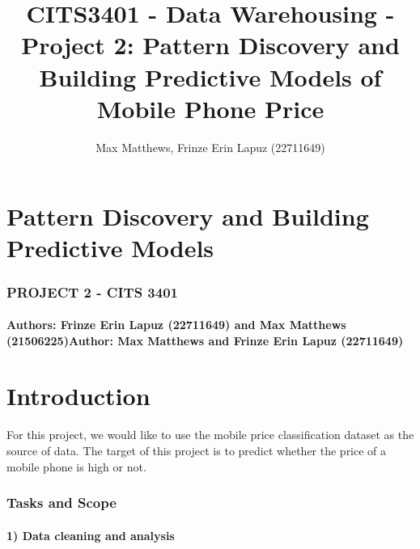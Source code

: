 \documentclass[11pt]{article}
\title{CITS3401 - Data Warehousing - Project 2: Pattern Discovery and Building Predictive Models of Mobile Phone Price}
\author{Max Matthews, Frinze Erin Lapuz (22711649)}
\begin{document}
    
    \maketitle
    
    

    
    \hypertarget{pattern-discovery-and-building-predictive-models}{%
\section{Pattern Discovery and Building Predictive
Models}\label{pattern-discovery-and-building-predictive-models}}

\hypertarget{project-2---cits-3401}{%
\subsubsection{PROJECT 2 - CITS 3401}\label{project-2---cits-3401}}

\hypertarget{authors-frinze-erin-lapuz-22711649-and-max-matthews-21506225author-max-matthews-and-frinze-erin-lapuz-22711649}{%
\paragraph{Authors: Frinze Erin Lapuz (22711649) and Max Matthews
(21506225)Author: Max Matthews and Frinze Erin Lapuz
(22711649)}\label{authors-frinze-erin-lapuz-22711649-and-max-matthews-21506225author-max-matthews-and-frinze-erin-lapuz-22711649}}

    \hypertarget{introduction}{%
\section{Introduction}\label{introduction}}

For this project, we would like to use the mobile price classification
dataset as the source of data. The target of this project is to predict
whether the price of a mobile phone is high or not.

    \hypertarget{tasks-and-scope}{%
\subsubsection{Tasks and Scope}\label{tasks-and-scope}}

\hypertarget{data-cleaning-and-analysis}{%
\paragraph{1) Data cleaning and
analysis}\label{data-cleaning-and-analysis}}
\end{document}
